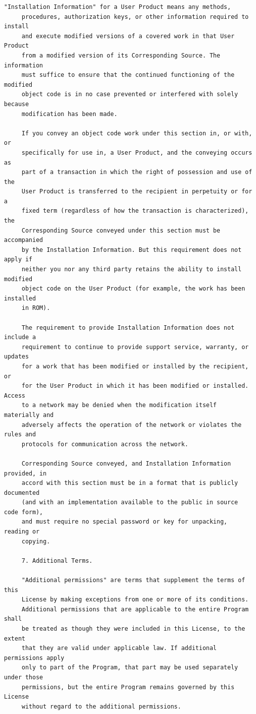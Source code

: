 \begin{lstlisting}[basicstyle=\ttfamily\footnotesize,breaklines=true]
     "Installation Information" for a User Product means any methods,
     procedures, authorization keys, or other information required to install
     and execute modified versions of a covered work in that User Product
     from a modified version of its Corresponding Source. The information
     must suffice to ensure that the continued functioning of the modified
     object code is in no case prevented or interfered with solely because
     modification has been made.

     If you convey an object code work under this section in, or with, or
     specifically for use in, a User Product, and the conveying occurs as
     part of a transaction in which the right of possession and use of the
     User Product is transferred to the recipient in perpetuity or for a
     fixed term (regardless of how the transaction is characterized), the
     Corresponding Source conveyed under this section must be accompanied
     by the Installation Information. But this requirement does not apply if
     neither you nor any third party retains the ability to install modified
     object code on the User Product (for example, the work has been installed
     in ROM).

     The requirement to provide Installation Information does not include a
     requirement to continue to provide support service, warranty, or updates
     for a work that has been modified or installed by the recipient, or
     for the User Product in which it has been modified or installed. Access
     to a network may be denied when the modification itself materially and
     adversely affects the operation of the network or violates the rules and
     protocols for communication across the network.

     Corresponding Source conveyed, and Installation Information provided, in
     accord with this section must be in a format that is publicly documented
     (and with an implementation available to the public in source code form),
     and must require no special password or key for unpacking, reading or
     copying.

     7. Additional Terms.

     "Additional permissions" are terms that supplement the terms of this
     License by making exceptions from one or more of its conditions.
     Additional permissions that are applicable to the entire Program shall
     be treated as though they were included in this License, to the extent
     that they are valid under applicable law. If additional permissions apply
     only to part of the Program, that part may be used separately under those
     permissions, but the entire Program remains governed by this License
     without regard to the additional permissions.


\end{lstlisting}
